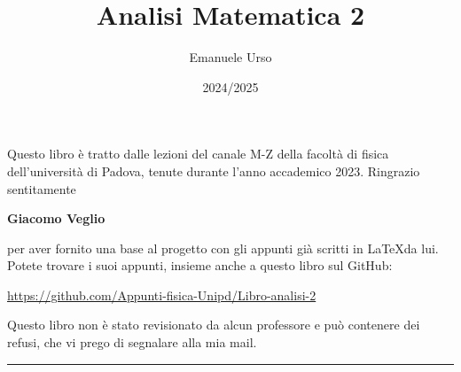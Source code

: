 \documentclass[a4paper]{article}
\begin{document}
	

	
	\title{\Huge Analisi Matematica 2}
	\author{{\Large Emanuele Urso} \\
	{\small{\href{mailto:emanuele.urso@proton.me}{\color{black}{emanuele.urso@proton.me} }}}}
	\date{2024/2025}
	\maketitle
	
	
	\vfill
	
	Questo libro è tratto dalle lezioni del canale M-Z della facoltà di fisica dell'università di Padova, tenute durante l'anno accademico 2023. Ringrazio sentitamente
	
	{\centering \large \textbf{Giacomo Veglio} \par}
	
	per aver fornito una base al progetto con gli appunti già scritti in \LaTeX da lui. Potete trovare i suoi appunti, insieme anche a questo libro sul GitHub: 
	
	{\centering \color{blue}
	\url{https://github.com/Appunti-fisica-Unipd/Libro-analisi-2} \par} 
	
	Questo libro non è stato revisionato da alcun professore e può contenere dei refusi, che vi prego di segnalare alla mia mail.
		
	\vspace{3em}
	
	
	\begin{center}
		\rule{.9\textwidth}{0.4pt}%
	\end{center}
	
	\hypersetup{linkcolor=black}
	\tableofcontents   
	
\newpage



\newpage



\newpage




\newpage



\newpage


\end{document}
